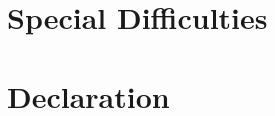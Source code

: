 \documentclass[12pt,a4paper,twoside,openright]{report}
\begin{document}
\section*{Special Difficulties}

\newpage

\section*{Declaration}


\tableofcontents


\listoffigures


\listoftables













\appendix


\nocite{pnn, polonium, pnn-parallel, sigmoidal, nonlinearities, DBLP:journals/corr/LuongPM15, 7266837, 2017arXiv171010903V, 279181, DBLP:journals/corr/KingmaB14, DBLP:journals/corr/VaswaniSPUJGKP17, REST-general, chollet2015keras, DBLP:journals/corr/IoffeS15, Rutkowski2004}
\end{document}
